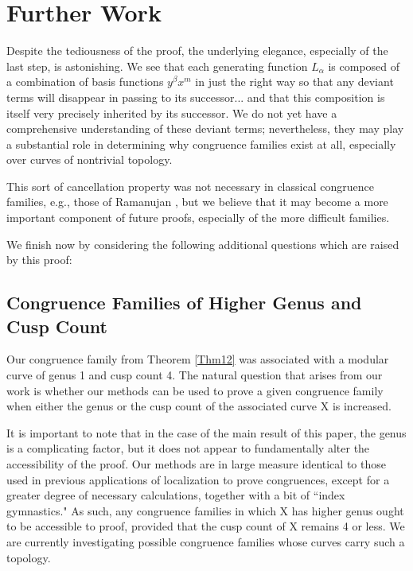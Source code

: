 \documentclass[reqno]{amsart}
\theoremstyle{definition}
\theoremstyle{remark}
\numberwithin{equation}{section}
\begin{document}
\section{Further Work}\label{sectionfurther}

Despite the tediousness of the proof, the underlying elegance, especially of the last step, is astonishing.  We see that each generating function $L_{\alpha}$ is composed of a combination of basis functions $y^{\beta}x^m$ in just the right way so that any deviant terms will disappear in passing to its successor... and that this composition is itself very precisely inherited by its successor.  We do not yet have a comprehensive understanding of these deviant terms; nevertheless, they may play a substantial role in determining why congruence families exist at all, especially over curves of nontrivial topology.

This sort of cancellation property was not necessary in classical congruence families, e.g., those of Ramanujan \cite{Ramanujan}, but we believe that it may become a more important component of future proofs, especially of the more difficult families.

We finish now by considering the following additional questions which are raised by this proof:

\subsection{Congruence Families of Higher Genus and Cusp Count}

Our congruence family from Theorem \ref{Thm12} was associated with a modular curve of genus 1 and cusp count 4.  The natural question that arises from our work is whether our methods can be used to prove a given congruence family when either the genus or the cusp count of the associated curve $\mathrm{X}$ is increased.

It is important to note that in the case of the main result of this paper, the genus is a complicating factor, but it does not appear to fundamentally alter the accessibility of the proof.  Our methods are in large measure identical to those used in previous applications of localization to prove congruences, except for a greater degree of necessary calculations, together with a bit of ``index gymnastics."  As such, any congruence families in which $\mathrm{X}$ has higher genus ought to be accessible to proof, provided that the cusp count of $\mathrm{X}$ remains 4 or less.  We are currently investigating possible congruence families whose curves carry such a topology.
\end{document}
